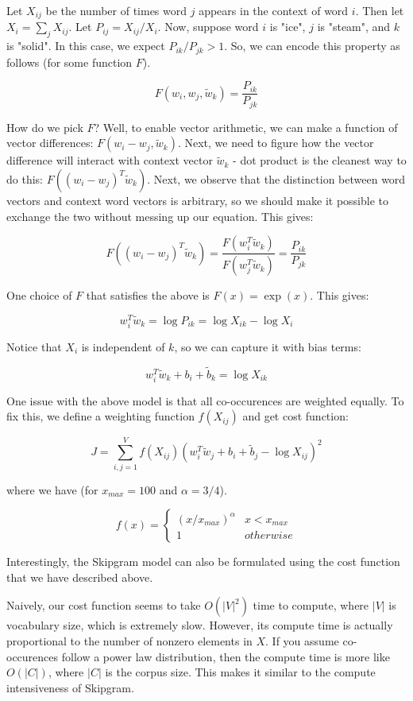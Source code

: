 \documentclass[a4paper]{article}
\begin{document}
Let $X_{ij}$ be the number of times word $j$ appears in the context of word $i$.
Then let $X_i = \sum_{j}{X_{ij}}$. Let $P_{ij} = X_{ij}/X_i$. Now, suppose
word $i$ is "ice", $j$ is "steam", and $k$ is "solid". In this case, we expect
$P_{ik}/P_{jk} > 1$. So, we can encode this property as follows (for some
function $F$).

$$
F(w_i, w_j, \tilde{w}_k) = \frac{P_{ik}}{P_{jk}}
$$

How do we pick $F$? Well, to enable vector arithmetic, we can make a function
of vector differences: $F(w_i - w_j, \tilde{w}_k)$. Next, we need to figure
how the vector difference will interact with context vector $\tilde{w}_k$ -
dot product is the cleanest way to do this: $F((w_i - w_j)^T \tilde{w}_k)$.
Next, we observe that the distinction between word vectors and context word
vectors is arbitrary, so we should make it possible to exchange the two without
messing up our equation. This gives:

$$
F((w_i - w_j)^T \tilde{w}_k) = \frac{F(w_i^T \tilde{w}_k)}{F(w_j^T \tilde{w}_k)}
= \frac{P_{ik}}{P_{jk}}
$$

One choice of $F$ that satisfies the above is $F(x) = \exp(x)$. This gives:

$$
w_i^T \tilde{w}_k = \log{P_{ik}} = \log{X_{ik}} - \log{X_{i}}
$$

Notice that $X_i$ is independent of $k$, so we can capture it with bias terms:

$$
w_i^T \tilde{w}_k + b_i + \tilde{b}_k = \log{X_{ik}}
$$

One issue with the above model is that all co-occurences are weighted equally.
To fix this, we define a weighting function $f(X_{ij})$ and get cost function:

$$
J = \sum_{i, j = 1}^{V}{
f(X_{ij})(w_i^T \tilde{w}_j + b_i + \tilde{b}_j - \log{X_{ij}})^2
}
$$

where we have (for $x_{max} = 100$ and $\alpha = 3/4$).

$$
f(x) = \begin{cases}
      (x/x_{max})^{\alpha} & x < x_{max} \\
      1 & otherwise
   \end{cases}
$$

Interestingly, the Skipgram model can also be formulated using the cost
function that we have described above.

Naively, our cost function seems to take $O(|V|^2)$ time to compute, where
$|V|$ is vocabulary size, which is extremely slow. However, its compute time is
actually proportional to the number of nonzero elements in $X$. If you assume
co-occurences follow a power law distribution, then the compute time is more
like $O(|C|)$, where $|C|$ is the corpus size. This makes it similar to the
compute intensiveness of Skipgram.
\end{document}
